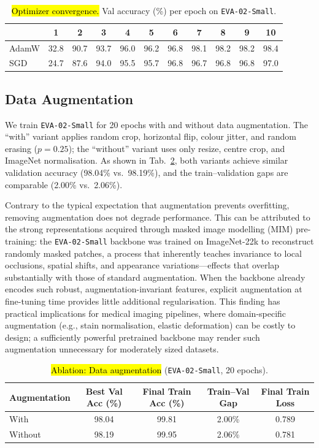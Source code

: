 \begin{table}[t]
\centering
\caption{\hl{Optimizer convergence.} Val accuracy (\%) per epoch on \texttt{EVA-02-Small}.}
\label{tab:ablation_opt_epochs}
\footnotesize
\setlength{\tabcolsep}{3pt}
\begin{tabular}{lcccccccccc}
\toprule
 & 1 & 2 & 3 & 4 & 5 & 6 & 7 & 8 & 9 & 10 \\
\midrule
AdamW & 32.8 & 90.7 & 93.7 & 96.0 & 96.2 & 96.8 & 98.1 & 98.2 & 98.2 & \cellcolor{blue!8}98.4 \\
SGD   & 24.7 & 87.6 & 94.0 & 95.5 & 95.7 & 96.8 & 96.7 & 96.8 & 96.8 & \cellcolor{blue!8}97.0 \\
\bottomrule
\end{tabular}
\end{table}

\subsection{Data Augmentation}

We train \texttt{EVA-02-Small} for 20 epochs with and without data augmentation. The ``with'' variant applies random crop, horizontal flip, colour jitter, and random erasing ($p{=}0.25$); the ``without'' variant uses only resize, centre crop, and ImageNet normalisation. As shown in Tab.~\ref{tab:ablation_aug}, both variants achieve similar validation accuracy (98.04\% vs.\ 98.19\%), and the train--validation gaps are comparable (2.00\% vs.\ 2.06\%).

Contrary to the typical expectation that augmentation prevents overfitting, removing augmentation does not degrade performance. This can be attributed to the strong representations acquired through masked image modelling (MIM) pre-training: the \texttt{EVA-02-Small} backbone was trained on ImageNet-22k to reconstruct randomly masked patches, a process that inherently teaches invariance to local occlusions, spatial shifts, and appearance variations---effects that overlap substantially with those of standard augmentation. When the backbone already encodes such robust, augmentation-invariant features, explicit augmentation at fine-tuning time provides little additional regularisation. This finding has practical implications for medical imaging pipelines, where domain-specific augmentation (e.g., stain normalisation, elastic deformation) can be costly to design; a sufficiently powerful pretrained backbone may render such augmentation unnecessary for moderately sized datasets.

\begin{table}[t]
\centering
\caption{\hl{Ablation: Data augmentation} (\texttt{EVA-02-Small}, 20 epochs).}
\label{tab:ablation_aug}
\small
\begin{tabular}{lcccc}
\toprule
Augmentation & Best Val Acc (\%) & Final Train Acc (\%) & Train--Val Gap & Final Train Loss \\
\midrule
With    & 98.04 & 99.81 & 2.00\% & 0.789 \\
Without & \cellcolor{blue!8}98.19 & 99.95 & 2.06\% & 0.781 \\
\bottomrule
\end{tabular}
\end{table}

